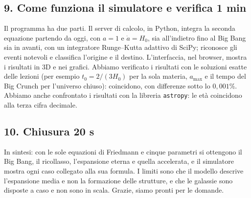 \subsection*{9. Come funziona il simulatore e verifica \hfill\normalfont\small 1 min}
Il programma ha due parti. Il server di calcolo, in Python, integra la seconda equazione partendo da oggi, con $a = 1$ e $\dot a = H_0$, sia all'indietro fino al Big Bang sia in avanti, con un integratore Runge--Kutta adattivo di SciPy; riconosce gli eventi notevoli e classifica l'origine e il destino. L'interfaccia, nel browser, mostra i risultati in 3D e nei grafici.
Abbiamo verificato i risultati con le soluzioni esatte delle lezioni (per esempio $t_0 = 2/(3H_0)$ per la sola materia, $a_{\max}$ e il tempo del Big Crunch per l'universo chiuso): coincidono, con differenze sotto lo $0{,}001\%$.
Abbiamo anche confrontato i risultati con la libreria \texttt{astropy}: le età coincidono alla terza cifra decimale.

\subsection*{10. Chiusura \hfill\normalfont\small 20 s}
In sintesi: con le sole equazioni di Friedmann e cinque parametri si ottengono il Big Bang, il ricollasso, l'espansione eterna e quella accelerata, e il simulatore mostra ogni caso collegato alla sua formula.
I limiti sono che il modello descrive l'espansione media e non la formazione delle strutture, e che le galassie sono disposte a caso e non sono in scala.
Grazie, siamo pronti per le domande.
